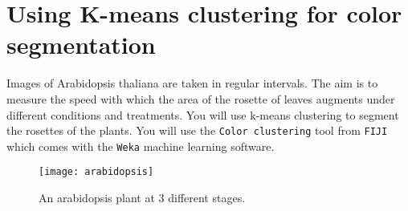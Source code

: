 \section{Using K-means clustering for color segmentation}

Images of Arabidopsis thaliana are taken in regular intervals. The aim is to measure the speed with which the area of the rosette of leaves augments under different conditions and treatments. You will use k-means clustering to segment the rosettes of the plants. You will use the {\tt Color clustering} tool from {\tt FIJI} which comes with the {\tt Weka} machine learning software.   

\begin{figure}[!htb]
 \centering
 \texttt{[image: arabidopsis]}
 \caption{An arabidopsis plant at 3 different stages.}
 \label{figure:arabidopsis}
\end{figure}

